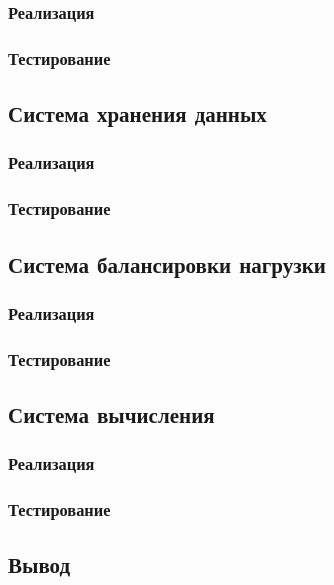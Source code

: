 \documentclass[a4paper,12pt]{report}
\numberwithin{equation}{section}
\begin{document}
\subsubsection{Реализация}

\subsubsection{Тестирование}

\subsection{Система хранения данных}
\subsubsection{Реализация}

\subsubsection{Тестирование}

\subsection{Система балансировки нагрузки}
\subsubsection{Реализация}

\subsubsection{Тестирование}

\subsection{Система вычисления}
\subsubsection{Реализация}

\subsubsection{Тестирование}

\subsection{Вывод}
\end{document}

